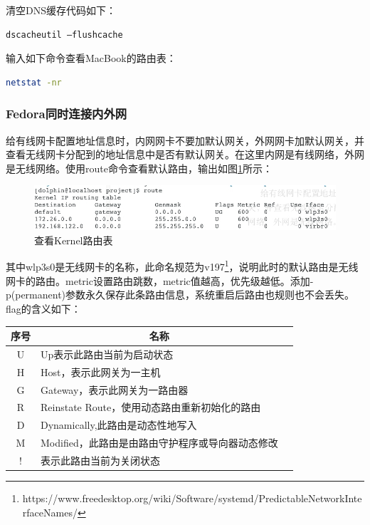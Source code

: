 \documentclass[letter]{book}
\begin{document}
清空DNS缓存代码如下：

\begin{lstlisting}[language=Bash]
dscacheutil –flushcache
\end{lstlisting}

输入如下命令查看MacBook的路由表：

\begin{lstlisting}[language=Bash]
netstat -nr
\end{lstlisting}

\subsubsection{Fedora同时连接内外网}

给有线网卡配置地址信息时，内网网卡不要加默认网关，外网网卡加默认网关，并查看无线网卡分配到的地址信息中是否有默认网关。在这里内网是有线网络，外网是无线网络。使用route命令查看默认路由，输出如图\ref{fig:routetable}所示：

\begin{figure}[htbp]
	\centering
	\includegraphics[scale=0.4]{route-table.jpg}
	\caption{查看Kernel路由表}
	\label{fig:routetable}
\end{figure}

其中wlp3s0是无线网卡的名称，此命名规范为v197\footnote{https://www.freedesktop.org/wiki/Software/systemd/PredictableNetworkInterfaceNames/}，说明此时的默认路由是无线网卡的路由。metric设置路由跳数，metric值越高，优先级越低。添加-p(permanent)参数永久保存此条路由信息，系统重启后路由也规则也不会丢失。flag的含义如下：

\begin{tabular}{cp{10cm}c}
	\hline
	\multirow{1}{*}{序号}
	& \multicolumn{1}{c}{名称}  \\
	\hline			
	U  & Up表示此路由当前为启动状态 \\	
	H & Host，表示此网关为一主机 \\
	G & Gateway，表示此网关为一路由器\\
	R & Reinstate Route，使用动态路由重新初始化的路由\\
	D & Dynamically,此路由是动态性地写入\\
	M & Modified，此路由是由路由守护程序或导向器动态修改\\
	! & 表示此路由当前为关闭状态\\
	\hline
\end{tabular}
\end{document}

